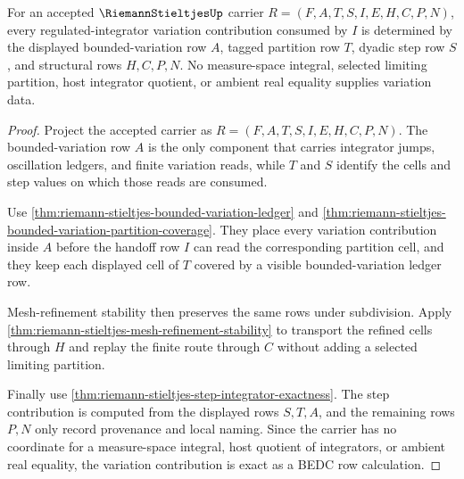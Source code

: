 \begin{theorem}
\label{thm:riemann-stieltjes-regulated-integrator-variation-exactness}
For an accepted $\RiemannStieltjesUp$ carrier $R=(F,A,T,S,I,E,H,C,P,N)$, every regulated-integrator variation contribution consumed by $I$ is determined by the displayed bounded-variation row $A$, tagged partition row $T$, dyadic step row $S$, and structural rows $H,C,P,N$. No measure-space integral, selected limiting partition, host integrator quotient, or ambient real equality supplies variation data.
\end{theorem}
\begin{proof}
Project the accepted carrier as $R=(F,A,T,S,I,E,H,C,P,N)$. The bounded-variation row $A$ is the only component that carries integrator jumps, oscillation ledgers, and finite variation reads, while $T$ and $S$ identify the cells and step values on which those reads are consumed.

Use \autoref{thm:riemann-stieltjes-bounded-variation-ledger} and \autoref{thm:riemann-stieltjes-bounded-variation-partition-coverage}. They place every variation contribution inside $A$ before the handoff row $I$ can read the corresponding partition cell, and they keep each displayed cell of $T$ covered by a visible bounded-variation ledger row.

Mesh-refinement stability then preserves the same rows under subdivision. Apply \autoref{thm:riemann-stieltjes-mesh-refinement-stability} to transport the refined cells through $H$ and replay the finite route through $C$ without adding a selected limiting partition.

Finally use \autoref{thm:riemann-stieltjes-step-integrator-exactness}. The step contribution is computed from the displayed rows $S,T,A$, and the remaining rows $P,N$ only record provenance and local naming. Since the carrier has no coordinate for a measure-space integral, host quotient of integrators, or ambient real equality, the variation contribution is exact as a BEDC row calculation.
\end{proof}

